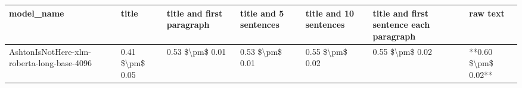 \begin{tabular}{lllllll}
\toprule
                                model\_name &           title & title and first paragraph & title and 5 sentences & title and 10 sentences & title and first sentence each paragraph &            raw text \\
\midrule
AshtonIsNotHere-xlm-roberta-long-base-4096 & 0.41 \$\textbackslash pm\$ 0.05 &           0.53 \$\textbackslash pm\$ 0.01 &       0.53 \$\textbackslash pm\$ 0.01 &        0.55 \$\textbackslash pm\$ 0.02 &                         0.55 \$\textbackslash pm\$ 0.02 & **0.60 \$\textbackslash pm\$ 0.02** \\
\bottomrule
\end{tabular}
